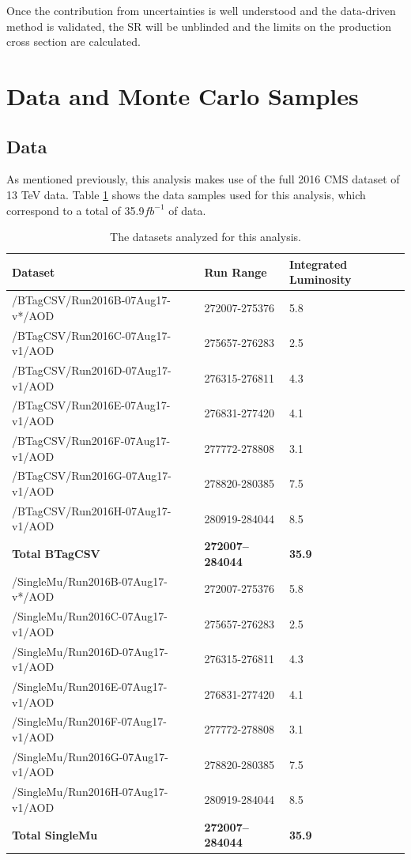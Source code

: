 Once the contribution from uncertainties is well understood and the data-driven method is validated, the SR will be unblinded and the limits on the production cross section are calculated.

\section{Data and Monte Carlo Samples \label{sec:datasets}}
\subsection{Data}
As mentioned previously, this analysis makes use of the full 2016 CMS dataset of 13 TeV data. Table \ref{tab:dataSamples} shows the data samples used for this analysis, which correspond to a total of 35.9$fb^{-1}$ of data. 

\begin{table}[hbtp]\footnotesize
\centering
\begin{tabular}{l l l}
\hline
 Dataset & Run Range & Integrated Luminosity \\
\hline
/BTagCSV/Run2016B-07Aug17-v*/AOD & 272007-275376 & 5.8 \\
/BTagCSV/Run2016C-07Aug17-v1/AOD & 275657-276283 & 2.5 \\
/BTagCSV/Run2016D-07Aug17-v1/AOD & 276315-276811 & 4.3 \\
/BTagCSV/Run2016E-07Aug17-v1/AOD & 276831-277420 & 4.1 \\
/BTagCSV/Run2016F-07Aug17-v1/AOD & 277772-278808 & 3.1 \\
/BTagCSV/Run2016G-07Aug17-v1/AOD & 278820-280385 & 7.5 \\
/BTagCSV/Run2016H-07Aug17-v1/AOD & 280919-284044 & 8.5 \\
{\bf Total BTagCSV} & {\bf 272007--284044} & {\bf 35.9} \\
\hline
/SingleMu/Run2016B-07Aug17-v*/AOD & 272007-275376 & 5.8 \\
/SingleMu/Run2016C-07Aug17-v1/AOD & 275657-276283 & 2.5 \\
/SingleMu/Run2016D-07Aug17-v1/AOD & 276315-276811 & 4.3 \\
/SingleMu/Run2016E-07Aug17-v1/AOD & 276831-277420 & 4.1 \\
/SingleMu/Run2016F-07Aug17-v1/AOD & 277772-278808 & 3.1 \\
/SingleMu/Run2016G-07Aug17-v1/AOD & 278820-280385 & 7.5 \\
/SingleMu/Run2016H-07Aug17-v1/AOD & 280919-284044 & 8.5 \\
{\bf Total SingleMu} & {\bf 272007--284044} & {\bf 35.9} \\
\hline
\end{tabular}
\caption{The datasets analyzed for this analysis.}
\label{tab:dataSamples}
\end{table}

